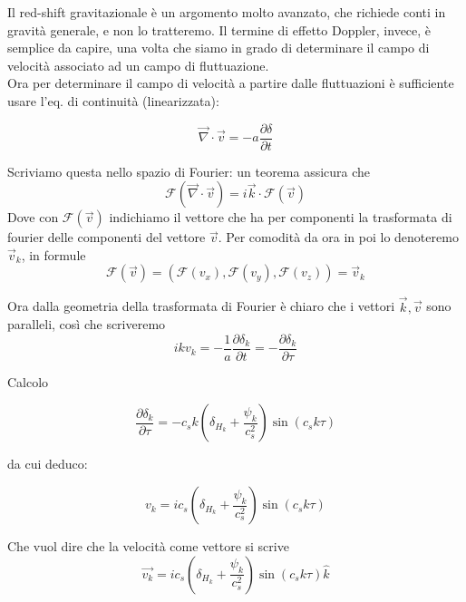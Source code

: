 \documentclass{report}
\begin{document}
Il red-shift gravitazionale è un argomento molto avanzato, che richiede conti in gravità generale, e non lo tratteremo. Il termine di effetto Doppler, invece, è semplice da capire, una volta che siamo in grado di determinare il campo di velocità associato ad un campo di fluttuazione. \\


Ora per determinare il campo di velocità a partire dalle fluttuazioni è sufficiente usare l'eq. di continuità (linearizzata): 

\begin{equation}
    \vec{\nabla}\cdot \vec{v} = -a\frac{\partial \delta}{\partial t}
\end{equation}

Scriviamo questa nello spazio di Fourier: un teorema assicura che  
\begin{equation}
    \mathcal{F}(\vec{\nabla}\cdot \vec{v}) = i\vec{k}\cdot \mathcal{F}(\vec{v})
\end{equation}
Dove con $\mathcal{F}(\vec{v})$ indichiamo il vettore che ha per componenti la trasformata di fourier delle componenti del vettore $\vec{v}$. Per comodità da ora in poi lo denoteremo $\vec{v}_k$,  in formule
\begin{equation}
    \mathcal{F}(\vec{v}) = (\mathcal{F}(v_x), \mathcal{F}(v_y), \mathcal{F}(v_z)) = \vec{v}_k
\end{equation}

Ora dalla geometria della trasformata di Fourier è chiaro che i vettori $\vec{k}, \vec{v}$ sono paralleli, così che scriveremo 
\begin{equation}
    ikv_k = -\frac{1}{a}\frac{\partial \delta_k}{\partial t} = -\frac{\partial \delta_k}{\partial \tau}
\end{equation}

Calcolo

\begin{equation}
    \frac{\partial \delta_k}{\partial \tau} = -c_sk\left(\delta_{H_k} + \frac{\psi_k}{c_s^2}\right)\sin(c_sk\tau)
\end{equation}

da cui deduco: 

\begin{equation}
    v_k = ic_s\left(\delta_{H_k} + \frac{\psi_k}{c_s^2}\right)\sin(c_sk\tau)
\end{equation}

Che vuol dire che la velocità come vettore si scrive 
\begin{equation}
    \vec{v_k} = ic_s\left(\delta_{H_k} + \frac{\psi_k}{c_s^2}\right)\sin(c_sk\tau)\hat{k}
\end{equation}
\end{document}
